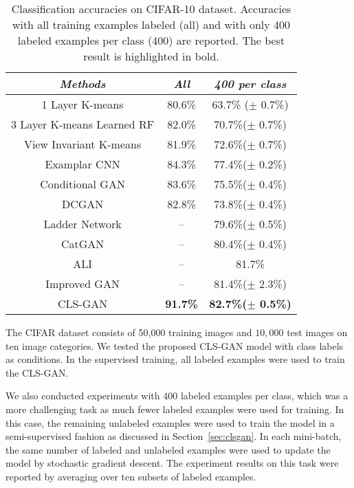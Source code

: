 \documentclass[11pt,fullpage, letterpaper,twoside]{article}
\newcommand{\1}[1]{\mathds{1}_{\left[#1\right]}}
\begin{document}
\begin{table}[]
\caption{Classification accuracies on CIFAR-10 dataset. Accuracies with all training examples labeled (all) and with only 400 labeled examples per class (400) are reported. The best result is highlighted in bold.
}
\label{tab:cifar10}
\begin{center}
\begin{tabular}{c||c|c}    \toprule
\emph{Methods} & \emph{All}& \emph{400 per class}   \\\midrule
1 Layer K-means \cite{radford2015unsupervised}& 80.6\% & 63.7\% ($\pm$ 0.7\%) \\
3 Layer K-means Learned RF \cite{coates2011selecting}& 82.0\% & 70.7\%($\pm$ 0.7\%)  \\
View Invariant K-means \cite{hui2013direct}& 81.9\% & 72.6\%($\pm$ 0.7\%) \\
Examplar CNN \cite{dosovitskiydiscriminative}& 84.3\% & 77.4\%($\pm$ 0.2\%) \\
Conditional GAN \cite{mirza2014conditional} & 83.6\% & 75.5\%($\pm$ 0.4\%)\\
DCGAN \cite{radford2015unsupervised}& 82.8\% & 73.8\%($\pm$ 0.4\%) \\
Ladder Network \cite{rasmus2015semi} &  -- & 79.6\%($\pm$ 0.5\%)\\
CatGAN \cite{springenberg2015unsupervised} & -- & 80.4\%($\pm$ 0.4\%) \\
ALI \cite{dumoulin2016adversarially} & -- & 81.7\%\\
Improved GAN \cite{salimans2016improved} & -- & 81.4\%($\pm$ 2.3\%) \\\midrule
CLS-GAN & \bf 91.7\% & \bf 82.7\%($\pm$ 0.5\%) \\\bottomrule
\end{tabular}
\end{center}
\end{table}

The CIFAR dataset \cite{krizhevsky2009learning} consists of 50,000 training images and $10,000$ test images on ten image categories.
We tested the proposed CLS-GAN model with class labels as conditions.  In the supervised training, all labeled examples were used to train the CLS-GAN.


We also conducted experiments with $400$ labeled examples per class, which was a more challenging task as much fewer labeled examples were used for training. In this case, the remaining unlabeled examples were used to train the model in a semi-supervised fashion as discussed in Section~\ref{sec:clsgan}. In each mini-batch, the same number of labeled and unlabeled examples were used to update the model by stochastic gradient descent. The experiment results on this task were reported by averaging over ten subsets of labeled examples.
\end{document}
